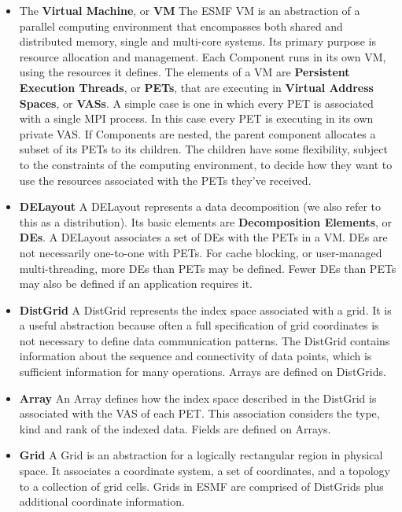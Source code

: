 \begin{itemize}

\item The {\bf Virtual Machine}, or {\bf VM} The ESMF VM is an 
abstraction of a parallel computing environment that encompasses 
both shared and distributed memory, single and multi-core systems.
Its primary purpose is resource allocation and management. Each Component
runs in its own VM, using the resources it defines. The elements of a VM
are {\bf Persistent Execution Threads}, or {\bf PETs}, that are
executing in {\bf Virtual Address Spaces}, or {\bf VASs}. A simple
case is one in which every PET is associated with a single MPI process.
In this case every PET is executing in its own private VAS. If Components
are nested, the parent component allocates a subset of its PETs to its
children. The children have some flexibility, subject to the constraints of
the computing environment, to decide how they want to use the
resources associated with the PETs they've received.

\item {\bf DELayout}  A DELayout represents a data decomposition
(we also refer to this as a distribution).  Its
basic elements are {\bf Decomposition Elements}, or {\bf DEs}.  
A DELayout associates a set of DEs with the PETs in a VM.  DEs are not
necessarily one-to-one with PETs.  For cache blocking,
or user-managed multi-threading, more DEs than PETs may be defined.
Fewer DEs than PETs may also be defined if an application requires it.

\item {\bf DistGrid}  A DistGrid represents the index space
associated with a grid.  It is a useful abstraction because
often a full specification of grid coordinates is not necessary
to define data communication patterns.  The DistGrid contains
information about the sequence and connectivity of data points,
which is sufficient information for many operations.  Arrays
are defined on DistGrids.

\item {\bf Array} An Array defines how the index space described
in the DistGrid is associated with the VAS of each PET. This association
considers the type, kind and rank of the indexed data. Fields are
defined on Arrays.

\item {\bf Grid}  A Grid is an abstraction for a logically rectangular 
region in physical space.  It associates a coordinate system, a set of 
coordinates, and a topology to a collection of grid cells.  Grids in ESMF 
are comprised of DistGrids plus additional coordinate information. 


\end{itemize}

